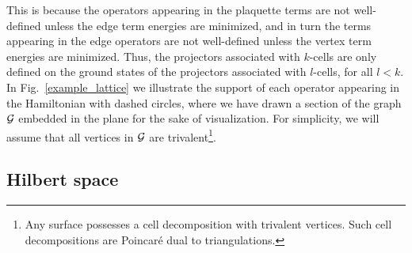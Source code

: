 This is because the operators appearing in the plaquette terms are not well-defined unless the edge term energies are minimized, and in turn the terms appearing in the edge operators are not well-defined unless the vertex term energies are minimized.
Thus, the projectors associated with $k$-cells are only defined on the ground states of the projectors associated with $l$-cells, for all $l<k$.  
In Fig.~\ref{example_lattice} we illustrate the support of each operator appearing in the Hamiltonian with dashed circles, where we have drawn a section of the graph $\mathcal{G}$ embedded in the plane for the sake of visualization. 
For simplicity, we will assume that all vertices in $\mathcal{G}$ are trivalent\footnote{Any surface possesses a cell decomposition with trivalent vertices.
Such cell decompositions are Poincar\'e dual to triangulations.}.




\subsection{Hilbert space} \label{hilbertspacesect}

